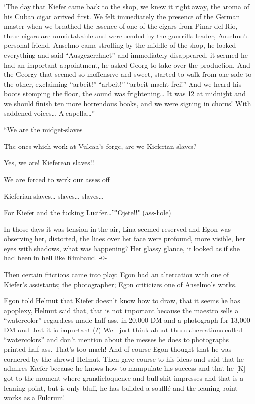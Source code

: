 \documentclass[smalldemyvopaper,11pt,twoside,onecolumn,openright,extrafontsizes]{memoir}
\begin{document}
\ornamentbreak

‘The day that Kiefer came back to the shop, we knew it right away, the aroma of his Cuban cigar arrived first. We felt immediately the presence of the German master when we breathed the essence of one of the cigars from Pinar del Rio, these cigars are unmistakable and were sended by the guerrilla leader, Anselmo’s personal friend. Anselmo came strolling by the middle of the shop, he looked everything and said “Ausgezerchnet” and immediately disappeared, it seemed he had an important appointment, he asked Georg to take over the production. And the Georgy that seemed so inoffensive and sweet, started to walk from one side to the other, exclaiming “arbeit!” “arbeit!” “arbeit macht frei!” And we heard his boots stomping the floor, the sound was frightening… It was 12 at midnight and we should finish ten more horrendous books, and we were signing in chorus! With saddened voices… A capella…”

“We are the midget-slaves 

The ones which work at Vulcan’s forge, are we Kieferian slaves?

Yes, we are! Kieferean slaves!!

We  are forced to work our asses off

Kieferian slaves… slaves… slaves…

For Kiefer and the fucking Lucifer…”"Ojete!!" (ass-hole)

\ornamentbreak

In those days it was tension in the air, Lina seemed reserved and Egon was observing her, distorted, the lines over her face were profound, more visible, her eyes with shadows, what was happening? Her glassy glance, it looked as if she had been in hell like Rimbaud. 
                              -0-
                              
Then certain frictions came into play: Egon had an altercation with one of Kiefer’s assistants; the photographer; Egon criticizes one of Anselmo’s works. 

Egon told Helmut that Kiefer doesn’t know how to draw, that it seems he has apoplexy, Helmut said that, that is not important because the maestro sells a “watercolor” regardless made half ass, in 20,000 DM and a photograph for 13,000 DM and that it is important (?) Well just think about those aberrations called “watercolors” and don’t mention about the messes he does to photographs printed half-ass. That’s too much! And of course Egon thought that he was cornered by the shrewd Helmut. Then gave course to his ideas and said that he admires Kiefer because he knows how to manipulate his success and that he [K] got to the moment where grandieloquence and bull-shit impresses and that is a leaning point, but is only bluff, he has builded a soufflé and the leaning point works as a Fulcrum!
\end{document}
